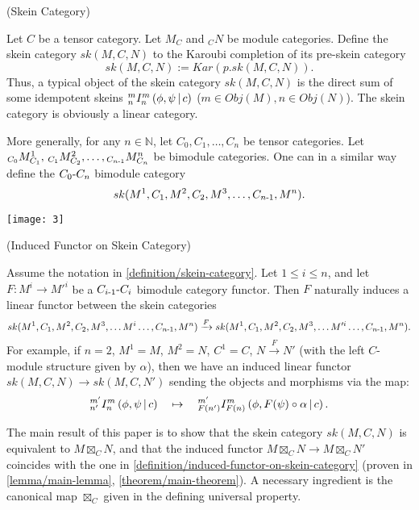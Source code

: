 \begin{definition}\label{definition/skein-category} (Skein Category)

  \noindent Let $C$ be a tensor category. Let $M_{C}$ and $_{C}N$ be module
  categories. \quad Define the skein category $sk(M,C,N)$ to the Karoubi
  completion of its pre-skein category
  \[
    sk(M,C,N) := Kar(p.sk(M,C,N)).
  \]
  \noindent Thus, a typical object of the skein category $sk(M,C,N)$ is the
  direct sum of some idempotent skeins ${}^{m}_{n} I^{m}_{n} \left( \phi, \psi \,\middle|\, c \right)$
  ($m \in Obj(M), n \in Obj(N)$). The skein category is obviously a linear
  category.

  More generally, for any $n \in \mathbb{N}$, let
  $C_{0}, C_{1}, \ldots, C_{n}$ be tensor categories. Let
  ${}_{C_{0}}M^{1}_{C_{1}}, \, {}_{C_{1}}M^{2}_{C_{2}}, \ldots, {}_{C_{n{\text -}1}}M^{n}_{C_{n}}$
  be bimodule categories. One can in a similar way define the
  $C_{0}{\text -}C_{n}$ bimodule category
  \[
    sk(M^{1}, C_{1}, M^{2}, C_{2}, M^{3}, \ldots, C_{n{\text -}1}, M^{n}).
  \]
  \begin{center}
    \texttt{[image: 3]}
  \end{center}

\end{definition}

\begin{definition} \label{definition/induced-functor-on-skein-category} (Induced Functor on Skein Category)

  \noindent Assume the notation in \ref{definition/skein-category}. Let
  $1 \leq i \leq n$, and let $F: M^{i} \to M'^{i}$ be a
  $C_{i{\text -}1}{\text -}C_{i}$ bimodule category functor. \quad Then $F$
  naturally induces a linear functor between the skein categories
  \[
    sk(M^{1}, C_{1}, M^{2}, C_{2}, M^{3}, \ldots M^{i} \ldots, C_{n{\text -}1}, M^{n})
    \xrightarrow{F}
    sk(M^{1}, C_{1}, M^{2}, C_{2}, M^{3}, \ldots M'^{i} \ldots, C_{n{\text -}1}, M^{n}).
  \]
  For example, if $n=2$, $M^{1} = M$, $M^{2} = N$, $C^{1} = C$, $N \xrightarrow{F} N'$
  (with the left $C$-module structure given by $\alpha$), then we have an
  induced linear functor $sk(M,C,N) \to sk(M,C,N')$ sending the objects and morphisms via the map:
  \[
    {}^{m'}_{n'} I^{m}_{n} \left( \phi, \psi \,\middle|\, c \right)
    \quad \mapsto \quad
    {}^{m'}_{F(n')} I^{m}_{F(n)} \left( \phi, F(\psi) \circ \alpha \,\middle|\, c \right).
  \]
\end{definition}

\noindent The main result of this paper is to show that the skein category
$sk(M,C,N)$ is equivalent to $M \boxtimes_{C} N$, and that the induced functor $M \boxtimes_{C} N \to M \boxtimes_{C} N'$
coincides with the one in \ref{definition/induced-functor-on-skein-category}
(proven in \ref{lemma/main-lemma}, \ref{theorem/main-theorem}). A necessary
ingredient is the canonical map $\boxtimes_{C}$ given in the defining universal
property.

